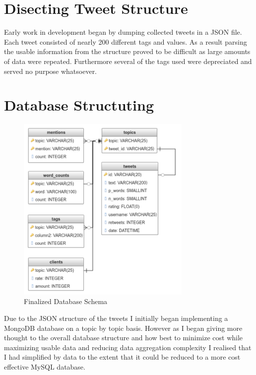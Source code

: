 \documentclass[12pt,a4paper]{report}
\begin{document}
  \section{Disecting Tweet Structure}
  Early work in development began by dumping collected tweets in a JSON\cite{JSON} file. Each tweet consisted of nearly 200 different tags and values. As a result parsing the usable information from the structure proved to be difficult as large amounts of data were repeated. Furthermore several of the tags used were depreciated and served no purpose whatsoever. 
  \section{Database Structuting}
  \begin{figure}
    \centering
    \includegraphics[width=0.75\textwidth]{dber}
    \caption{Finalized Database Schema}
    \label{fig:dber}
  \end{figure}
  Due to the JSON\cite{JSON} structure of the tweets I initially began implementing a MongoDB database on a topic by topic basis. However as I began giving more thought to the overall database structure and how best to minimize cost while maximizing usable data and reducing data aggregation complexity I realised that I had simplified by data to the extent that it could be reduced to a more cost effective MySQL database.
  \clearpage
\end{document}
